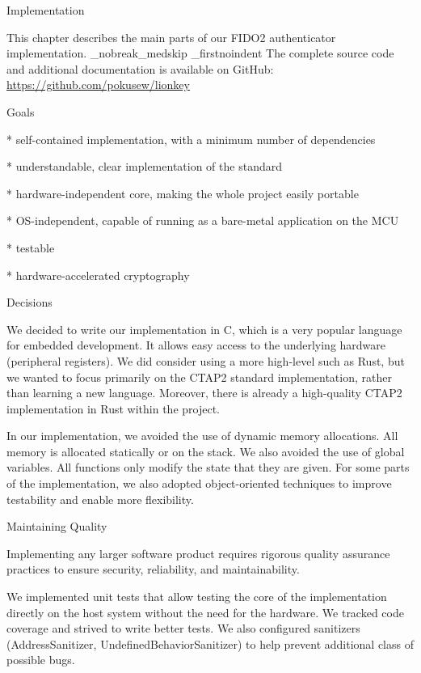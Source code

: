 \chap[implementation] Implementation

This chapter describes the main parts of our FIDO2 authenticator implementation.
\_nobreak\_medskip
\_firstnoindent
The complete source code and additional documentation is available on GitHub:\nl
\url{https://github.com/pokusew/lionkey}


\sec Goals

\begitems

* self-contained implementation, with {\sbf a minimum number of dependencies}

* understandable, clear implementation of the standard

* hardware-independent core, making the whole project easily portable

* OS-independent, capable of running as a bare-metal application on the MCU

* testable

* hardware-accelerated cryptography

\enditems


\sec Decisions

We decided to write our implementation in {\sbf C}, which is a very popular language for embedded development. It allows easy access to the underlying hardware (peripheral registers). We did consider using a more high-level such as Rust, but we wanted to focus primarily on the CTAP2 standard implementation, rather than learning a new language. Moreover, there is already a high-quality CTAP2 implementation in Rust within the  project.

In our implementation, we avoided the use of dynamic memory allocations. All memory is allocated statically or on the stack. We also avoided the use of global variables. All functions only modify the state that they are given. For some parts of the implementation, we also adopted object-oriented techniques to improve testability and enable more flexibility.


\sec Maintaining Quality

Implementing any larger software product requires rigorous quality assurance practices to ensure security, reliability, and maintainability.

We implemented unit tests that allow testing the core of the implementation directly on the host system without the need for the hardware. We tracked code coverage and strived to write better tests. We also configured sanitizers (AddressSanitizer, UndefinedBehaviorSanitizer) to help prevent additional class of possible bugs.

